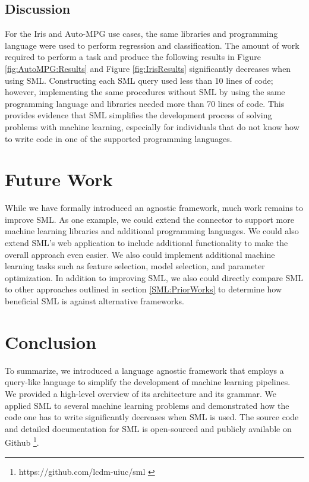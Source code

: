 \subsection{Discussion}
For the Iris and Auto-MPG use cases, the same libraries and programming language were used to perform regression and classification.  The amount of work required to perform a task and produce the following results in Figure \ref{fig:AutoMPG:Results} and Figure \ref{fig:IrisResults} significantly decreases when using SML.  Constructing each SML query used less than 10 lines of code; however, implementing the same procedures without SML by using the same programming language and libraries needed more than 70 lines of code.  This provides evidence that SML simplifies the development process of solving problems with machine learning, especially for individuals that do not know how to write code in one of the supported programming languages. 

\section{Future Work}

While we have formally introduced an agnostic framework, much work remains to improve SML. As one example, we could extend the connector to support more machine learning libraries and additional programming languages.  We could also extend SML's web application to include additional functionality to make the overall approach even easier. We also could implement additional machine learning tasks such as feature selection, model selection, and parameter optimization.  In addition to improving SML, we also could directly compare SML to other approaches outlined in section \ref{SML:PriorWorks} to determine how beneficial SML is against alternative frameworks.

\section{Conclusion}
\label{conclusion}
To summarize, we introduced a language agnostic framework that employs a query-like language to simplify the development of machine learning pipelines.  We provided a high-level overview of its architecture and its grammar. We applied SML to several machine learning problems and demonstrated how the code one has to write significantly decreases when SML is used.  The source code and detailed documentation for SML is open-sourced and publicly available on Github \footnote{https://github.com/lcdm-uiuc/sml \label{SML:Github}}. 

